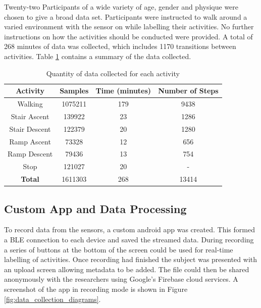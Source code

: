 \documentclass[sensors,article,submit,moreauthors,pdftex]{Definitions/mdpi}
\begin{document}
Twenty-two Participants of a wide variety of age, gender and physique were chosen to give a broad data set. Participants were instructed to walk around a varied environment with the sensor on while labelling their activities. No further instructions on how the activities should be conducted were provided. A total of 268 minutes of data was collected, which includes 1170 transitions between activities. Table \ref{tab:data_collected_summary} contains a summary of the data collected.

\begin{table}[!hbt]
    \centering
    \caption{Quantity of data collected for each activity}
    \label{tab:data_collected_summary}
    \begin{tabular}{cccc}
        \textbf{Activity} & \textbf{Samples} & \textbf{Time (minutes)} & \textbf{Number of Steps} \\
         \hline
         Walking & 1075211 & 179 & 9438 \\
         Stair Ascent & 139922 & 23 & 1286 \\
         Stair Descent & 122379 & 20 & 1280 \\ 
         Ramp Ascent & 73328 & 12 & 656 \\
         Ramp Descent & 79436 & 13 & 754 \\
         Stop & 121027 & 20 & - \\
         \hline
         \textbf{Total} & 1611303 & 268 & 13414
    \end{tabular}
\end{table}




\subsection{Custom App and Data Processing}
\label{sec:app}
To record data from the sensors, a custom android app was created. This formed a BLE connection to each device and saved the streamed data. During recording a series of buttons at the bottom of the screen could be used for real-time labelling of activities. Once recording had finished the subject was presented with an upload screen allowing metadata to be added. The file could then be shared anonymously with the researchers using Google's Firebase cloud services. A screenshot of the app in recording mode is shown in Figure \ref{fig:data_collection_diagrams}.
\end{document}
